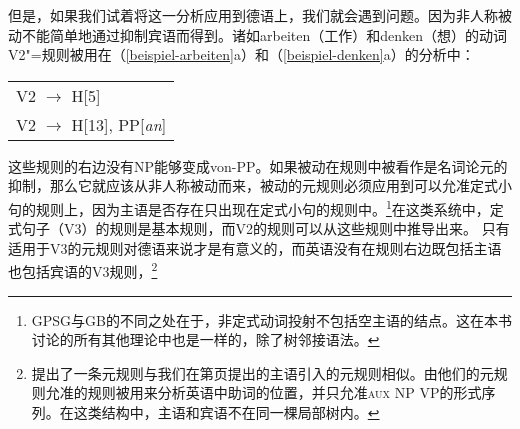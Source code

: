 但是，如果我们试着将这一分析应用到德语上，我们就会遇到问题。因为非人称被动不能简单地通过抑制宾语而得到。诸如arbeiten（工作）和denken（想）的动词V2"=规则被用在（\ref{beispiel-arbeiten}a）和（\ref{beispiel-denken}a）的分析中：
\ea
\begin{tabular}[t]{@{}l@{}}
V2 $\to$ H[5]\\
V2 $\to$ H[13], PP[\emph{an}]\\
\end{tabular}
\z
这些规则的右边没有NP能够变成von-PP。如果被动在规则中被看作是名词论元的抑制，那么它就应该从非人称被动而来，被动的元规则必须应用到可以允准定式小句的规则上，因为主语是否存在只出现在定式小句的规则中。\footnote{%
GPSG与GB\indexgbc 的不同之处在于，非定式动词投射不包括空主语的结点。这在本书讨论的所有其他理论中也是一样的，除了树邻接语法\indextagc。
}在这类系统中，定式句子（V3）的规则是基本规则，而V2的规则可以从这些规则中推导出来。
只有适用于V3的元规则对德语来说才是有意义的，而英语没有在规则右边既包括主语也包括宾语的V3规则，\footnote{%
 \citet[]{GKPS85a}提出了一条元规则与我们在第\pageref{subjekt-meta}页提出的主语引入的元规则相似。由他们的元规则允准的规则被用来分析英语中助词的位置，并只允准\textsc{aux} NP VP的形式序列。在这类结构中，主语和宾语不在同一棵局部树内。
}

